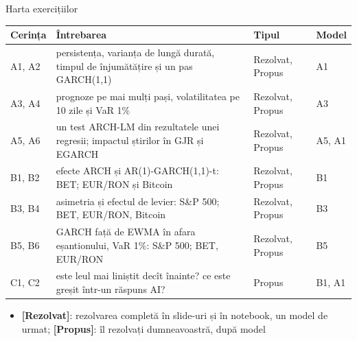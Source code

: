 \begin{frame}{Harta exercițiilor}
\itemsize{\small}
\begin{center}
\footnotesize
\begin{tabular}{>{\raggedright\arraybackslash}p{1.1cm}>{\raggedright\arraybackslash}p{7.5cm}>{\raggedright\arraybackslash}p{1.9cm}>{\raggedright\arraybackslash}p{1.4cm}}
\toprule
\textbf{Cerința} & \textbf{Întrebarea} & \textbf{Tipul} & \textbf{Model} \\
\midrule
A1, A2 & persistența, varianța de lungă durată, timpul de înjumătățire și un pas GARCH(1,1) & Rezolvat, Propus & A1 \\
A3, A4 & prognoze pe mai mulți pași, volatilitatea pe 10 zile și VaR 1\% & Rezolvat, Propus & A3 \\
A5, A6 & un test ARCH-LM din rezultatele unei regresii; impactul știrilor în GJR și EGARCH & Rezolvat, Propus & A5, A1 \\
B1, B2 & efecte ARCH și AR(1)-GARCH(1,1)-t: BET; EUR/RON și Bitcoin & Rezolvat, Propus & B1 \\
B3, B4 & asimetria și efectul de levier: S\&P 500; BET, EUR/RON, Bitcoin & Rezolvat, Propus & B3 \\
B5, B6 & GARCH față de EWMA în afara eșantionului, VaR 1\%: S\&P 500; BET, EUR/RON & Rezolvat, Propus & B5 \\
C1, C2 & este leul mai liniștit decît înainte? ce este greșit într-un răspuns AI? & Propus & B1, A1 \\
\bottomrule
\end{tabular}
\end{center}
\begin{itemize}
    \item \textbf{[Rezolvat]}: rezolvarea completă în slide-uri și în notebook, un model de urmat; \textbf{[Propus]}: îl rezolvați dumneavoastră, după model
\end{itemize}
\end{frame}

